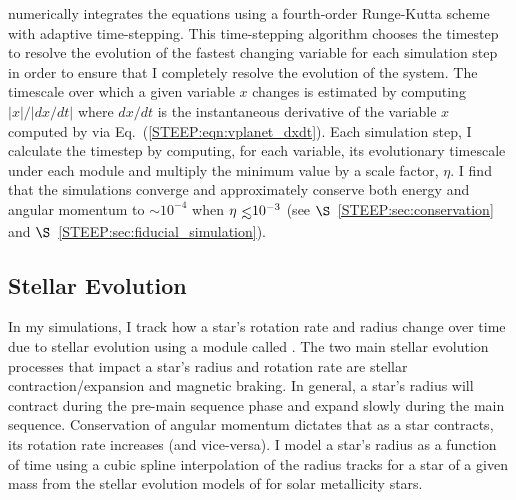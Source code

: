 \vplanet numerically integrates the equations using a fourth-order Runge-Kutta scheme with adaptive time-stepping.  This time-stepping algorithm chooses the timestep to resolve the evolution of the fastest changing variable for each simulation step in order to ensure that I completely resolve the evolution of the system.  The timescale over which a given variable $x$ changes is estimated by computing $|x|/|dx/dt|$ where $dx/dt$ is the instantaneous derivative of the variable $x$ computed by \vplanet via Eq.~(\ref{STEEP:eqn:vplanet_dxdt}).  Each simulation step, I calculate the timestep by computing, for each variable, its evolutionary timescale under each module and multiply the minimum value by a scale factor, $\eta$.   I find that the simulations converge and approximately conserve both energy and angular momentum to ${\sim}10^{-4}$ when $\eta \lsim 10^{-3}$ (see $\S$~\ref{STEEP:sec:conservation} and $\S$~\ref{STEEP:sec:fiducial_simulation}).



\subsection{Stellar Evolution} \label{STEEP:sec:stellar_evolution}

In my simulations, I track how a star's rotation rate and radius change over time due to stellar evolution using a module called \stellar.  The two main stellar evolution processes that impact a star's radius and rotation rate are stellar contraction/expansion and magnetic braking.  In general, a star's radius will contract during the pre-main sequence phase and expand slowly during the main sequence.  Conservation of angular momentum dictates that as a star contracts, its rotation rate increases (and vice-versa).  I model a star's radius as a function of time using a cubic spline interpolation of the radius tracks for a star of a given mass from the stellar evolution models of \citet{Baraffe2015} for solar metallicity stars.

